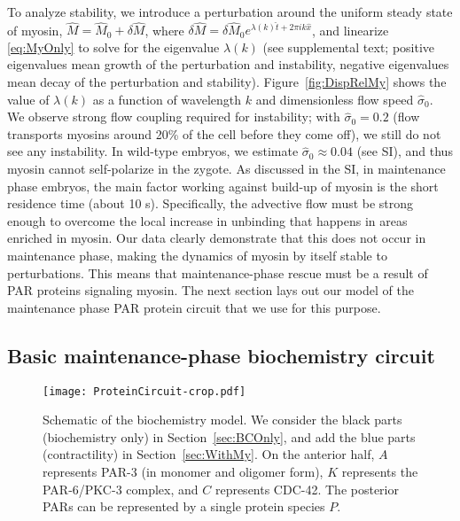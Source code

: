 \documentclass[11pt]{article}
\newcommand{\6}[1]{#1_{\text{6}}}
\newcommand{\3}[1]{#1_{\text{3}}}
\begin{document}
To analyze stability, we introduce a perturbation around the uniform steady state of myosin, $\hat M=\hat{M}_0+\delta \hat M$, where $\delta \hat M = \delta \hat M_0 e^{\lambda(k) \hat{t}+2 \pi i k \hat{x}}$, and linearize \eqref{eq:MyOnly} to solve for the eigenvalue $\lambda(k)$ (see supplemental text; positive eigenvalues mean growth of the perturbation and instability, negative eigenvalues mean decay of the perturbation and stability). Figure\ \ref{fig:DispRelMy} shows the value of $\lambda(k)$ as a function of wavelength $k$ and dimensionless flow speed $\hat \sigma_0$. We observe strong flow coupling required for instability; with $\hat{\sigma}_0=0.2$ (flow transports myosins around 20\% of the cell before they come off), we still do not see any instability. In wild-type embryos, we estimate $\hat \sigma_0 \approx 0.04$ (see SI), and thus myosin cannot self-polarize in the zygote. As discussed in the SI, in maintenance phase embryos, the main factor working {against} build-up of myosin is the short residence time (about 10 s). Specifically, the advective flow must be strong enough to overcome the local increase in unbinding that happens in areas enriched in myosin. Our data clearly demonstrate that this does not occur in maintenance phase, making the dynamics of myosin by itself stable to perturbations. This means that maintenance-phase rescue must be a result of PAR proteins signaling myosin. The next section lays out our model of the maintenance phase PAR protein circuit that we use for this purpose. 


\subsection{Basic maintenance-phase biochemistry circuit \label{sec:BCOnly}}
\begin{figure}
\centering
\texttt{[image: ProteinCircuit-crop.pdf]}
\caption{\label{fig:ModelSch}Schematic of the biochemistry model. We consider the black parts (biochemistry only) in Section\ \ref{sec:BCOnly}, and add the blue parts (contractility) in Section\ \ref{sec:WithMy}. On the anterior half, $A$ represents PAR-3 (in monomer and oligomer form), $K$ represents the PAR-6/PKC-3 complex, and $C$ represents CDC-42. The posterior PARs can be represented by a single protein species $P$.}
\end{figure}
\end{document}
